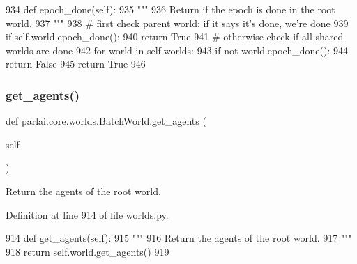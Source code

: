 \begin{DoxyCode}
934     \textcolor{keyword}{def }epoch\_done(self):
935         \textcolor{stringliteral}{"""}
936 \textcolor{stringliteral}{        Return if the epoch is done in the root world.}
937 \textcolor{stringliteral}{        """}
938         \textcolor{comment}{# first check parent world: if it says it's done, we're done}
939         \textcolor{keywordflow}{if} self.world.epoch\_done():
940             \textcolor{keywordflow}{return} \textcolor{keyword}{True}
941         \textcolor{comment}{# otherwise check if all shared worlds are done}
942         \textcolor{keywordflow}{for} world \textcolor{keywordflow}{in} self.worlds:
943             \textcolor{keywordflow}{if} \textcolor{keywordflow}{not} world.epoch\_done():
944                 \textcolor{keywordflow}{return} \textcolor{keyword}{False}
945         \textcolor{keywordflow}{return} \textcolor{keyword}{True}
946 
\end{DoxyCode}
\mbox{\label{classparlai_1_1core_1_1worlds_1_1BatchWorld_a1fc7faff8ccc60606ccff891d36e6b86}} 
\subsubsection{\texorpdfstring{get\+\_\+agents()}{get\_agents()}}
{\footnotesize\ttfamily def parlai.\+core.\+worlds.\+Batch\+World.\+get\+\_\+agents (\begin{DoxyParamCaption}\item[{}]{self }\end{DoxyParamCaption})}

\begin{DoxyVerb}Return the agents of the root world.
\end{DoxyVerb}
 

Definition at line 914 of file worlds.\+py.


\begin{DoxyCode}
914     \textcolor{keyword}{def }get\_agents(self):
915         \textcolor{stringliteral}{"""}
916 \textcolor{stringliteral}{        Return the agents of the root world.}
917 \textcolor{stringliteral}{        """}
918         \textcolor{keywordflow}{return} self.world.get\_agents()
919 
\end{DoxyCode}
\mbox{\label{classparlai_1_1core_1_1worlds_1_1BatchWorld_ab57e642368837b1a9ae79231ee213d46}} 
